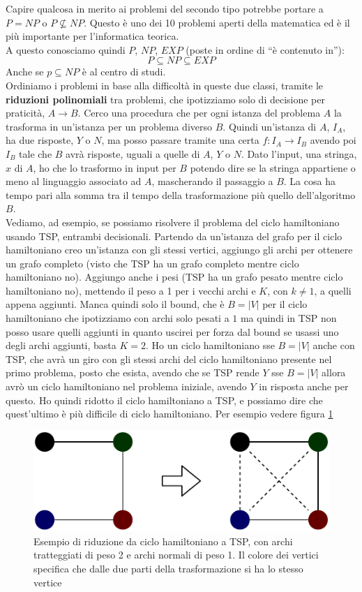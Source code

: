 \documentclass[a4paper,12pt, oneside]{book}
\begin{document}
Capire qualcosa in merito ai problemi del secondo tipo potrebbe portare a $P=NP$
o $P\not\subseteq NP$. Questo è uno dei 10 problemi aperti della matematica ed è
il più importante per l'informatica teorica.\\
A questo conosciamo quindi $P$, $NP$, $EXP$ (poste in ordine di ``è contenuto
in''):
\[P\subseteq NP \subseteq EXP\]
Anche se $p\subseteq NP$ è al centro di studi.\\
Ordiniamo i problemi in base alla difficoltà in queste due classi, tramite le
\textbf{riduzioni polinomiali} tra problemi, che ipotizziamo solo di decisione
per praticità, $A\to B$. Cerco una procedura che per ogni istanza del problema
$A$ la trasforma in un'istanza per un problema diverso $B$. Quindi un'istanza di
$A$, $I_A$, ha due risposte, $Y$ o $N$, ma posso passare tramite una certa
$f:I_A\to I_B$ avendo poi $I_B$ tale che $B$ avrà risposte, uguali a quelle di
$A$, $Y$ o $N$. Dato l'input, una stringa, $x$ di $A$, ho che lo trasformo in
input per $B$ potendo dire se la stringa appartiene o meno al linguaggio
associato ad $A$, mascherando il passaggio a $B$. La cosa ha tempo pari alla
somma tra il tempo della trasformazione più quello dell'algoritmo $B$.\\
Vediamo, ad esempio, se possiamo risolvere il problema del ciclo hamiltoniano
usando TSP, entrambi decisionali. Partendo da un'istanza del grafo per il ciclo
hamiltoniano creo un'istanza con gli stessi vertici, aggiungo gli archi per
ottenere un grafo completo (visto che TSP ha un grafo completo mentre ciclo
hamiltoniano no). Aggiungo anche i pesi (TSP ha un grafo pesato mentre ciclo
hamiltoniano no), mettendo il peso a 1 per i vecchi archi
e $K$, con $k\neq 1$, a quelli appena aggiunti. Manca quindi
solo il bound, che è $B=|V|$ per il ciclo hamiltoniano che ipotizziamo con archi
solo pesati a $1$ ma quindi in TSP non posso usare quelli aggiunti in quanto
uscirei per forza dal bound se usassi uno degli archi aggiunti, basta $K=2$. Ho
un ciclo hamiltoniano sse $B=|V|$ anche con TSP, che avrà un giro con gli stessi
archi del ciclo hamiltoniano presente nel primo problema, posto che esista,
avendo che se TSP rende $Y$ sse $B=|V|$ allora avrò un ciclo hamiltoniano nel
problema iniziale, avendo $Y$ in risposta anche per questo. Ho quindi ridotto il
ciclo hamiltoniano a TSP, e possiamo dire che quest'ultimo è più difficile di
ciclo hamiltoniano. Per esempio vedere figura \ref{fig:htsp}
\begin{figure}
  \centering
  \includegraphics[scale = 0.9]{img/rid.pdf}
  \caption{Esempio di riduzione da ciclo hamiltoniano a TSP, con archi
    tratteggiati di peso 2 e archi normali di peso 1. Il colore dei vertici
    specifica che dalle due parti della trasformazione si ha lo stesso vertice}
  \label{fig:htsp}
\end{figure}
\end{document}
